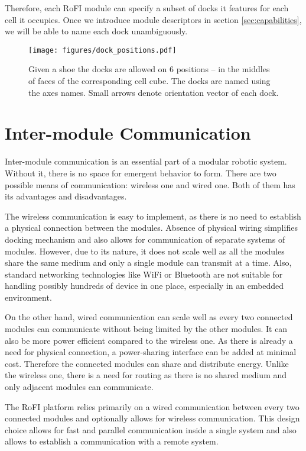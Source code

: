 Therefore, each RoFI module can specify a subset of docks it features for each
cell it occupies. Once we introduce module descriptors in section
\ref{sec:capabilities}, we will be able to name each dock unambiguously.

\begin{figure}[t]
    \centering
    \texttt{[image: figures/dock\_positions.pdf]}
    \caption{Given a shoe the docks are allowed on 6 positions -- in the
    middles of faces of the corresponding cell cube. The docks are named using
    the axes names. Small arrows denote orientation vector of each dock.}
    \label{fig:dock_positions}
\end{figure}

\section{Inter-module Communication}\label{sec:communication}

Inter-module communication is an essential part of a modular robotic system.
Without it, there is no space for emergent behavior to form. There are two
possible means of communication: wireless one and wired one. Both of them
has its advantages and disadvantages.

The wireless communication is easy to implement, as there is no need to
establish a physical connection between the modules. Absence of physical wiring
simplifies docking mechanism and also allows for communication of separate
systems of modules. However, due to its nature, it does not scale well as all
the modules share the same medium and only a single module can transmit at a
time. Also, standard networking technologies like WiFi or Bluetooth are not
suitable for handling possibly hundreds of device in one place, especially in
an embedded environment.

On the other hand, wired communication can scale well as every two connected
modules can communicate without being limited by the other modules. It can also
be more power efficient compared to the wireless one. As there is already a need
for physical connection, a power-sharing interface can be added at minimal cost.
Therefore the connected modules can share and distribute energy. Unlike the
wireless one, there is a need for routing as there is no shared medium and only
adjacent modules can communicate.

The RoFI platform relies primarily on a wired communication between every two
connected modules and optionally allows for wireless communication. This
design choice allows for fast and parallel communication inside a single system
and also allows to establish a communication with a remote system.

